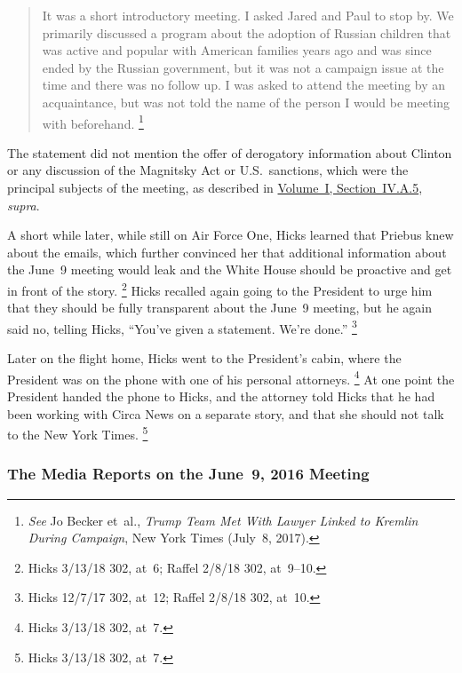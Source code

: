 \begin{quote}
It was a short introductory meeting.
I asked Jared and Paul to stop by.
We primarily discussed a program about the adoption of Russian children that was active and popular with American families years ago and was since ended by the Russian government, but it was not a campaign issue at the time and there was no follow up.
I was asked to attend the meeting by an acquaintance, but was not told the name of the person I would be meeting with beforehand.%
	\footnote{\textit{See} Jo Becker et~al., \textit{Trump Team Met With Lawyer Linked to Kremlin During Campaign}, New York Times (July~8, 2017).}
\end{quote}

The statement did not mention the offer of derogatory information about Clinton or any discussion of the Magnitsky Act or U.S.~sanctions, which were the principal subjects of the meeting, as described in \hyperlink{subsubsection.1.4.1.5}{Volume~I, Section~IV.A.5}, \textit{supra}.

A short while later, while still on Air Force One, Hicks learned that Priebus knew about the emails, which further convinced her that additional information about the June~9 meeting would leak and the White House should be proactive and get in front of the story.%
\footnote{Hicks 3/13/18 302, at~6;
Raffel 2/8/18 302, at~9--10.}
Hicks recalled again going to the President to urge him that they should be fully transparent about the June~9 meeting, but he again said no, telling Hicks, ``You've given a statement.
We're done.''%
\footnote{Hicks 12/7/17 302, at~12;
Raffel 2/8/18 302, at~10.}

Later on the flight home, Hicks went to the President's cabin, where the President was on the phone with one of his personal attorneys.%
\footnote{Hicks 3/13/18 302, at~7.}
At one point the President handed the phone to Hicks, and the attorney told Hicks that he had been working with Circa News on a separate story, and that she should not talk to the New York Times.%
\footnote{Hicks 3/13/18 302, at~7.}

\subsubsection{The Media Reports on the June~9, 2016 Meeting}

